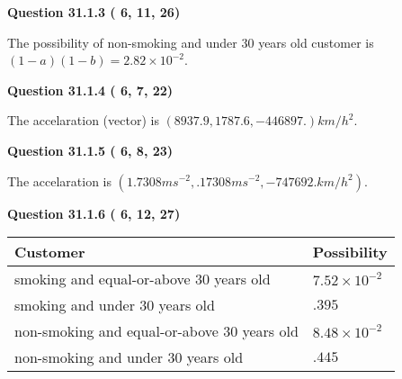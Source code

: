 \documentclass[12pt]{article}
\begin{document}
{\textbf{\Large{Question
31.1.3 
 (          6,         11,         26)
}}}
  
  
 
 
\noindent{}

The possibility of  %
 non-smoking and  %
under 30 years old
customer is $ (1-a)(1-b) =  %
2.82 \times 10^{-2} $.
 
 
  
\vspace{0.2in}
  
{\textbf{\Large{Question
31.1.4 
 (          6,          7,         22)
}}}
  
  
 
 
\noindent{}
 
 
The accelaration (vector) is
$(
8937.9,
1787.6 ,
-446897.
)km/h^2.
$
 
 
 
 
  
\vspace{0.2in}
  
{\textbf{\Large{Question
31.1.5 
 (          6,          8,         23)
}}}
  
  
 
 
\noindent{}
 
 
The accelaration is
$(
1.7308ms^{-2},
.17308ms^{-2},
-747692.km/h^2
).
$
 
 
 
 
  
\vspace{0.2in}
  
{\textbf{\Large{Question
31.1.6 
 (          6,         12,         27)
}}}
  
  
 
 
\noindent{}

 
\noindent
\begin{tabular}{|l|l|}
\hline
Customer & Possibility \\
\hline
smoking  and  %
equal-or-above 30 years old &
  $ %
7.52 \times 10^{-2}$ \\
\hline
smoking  and  %
under 30 years old &
  $ %
.395$ \\
\hline
 non-smoking and  %
equal-or-above 30 years old &
  $ %
8.48 \times 10^{-2}$ \\
\hline
 non-smoking and  %
under 30 years old &
  $ %
.445$ \\
\hline
\end{tabular}
 
\end{document}
